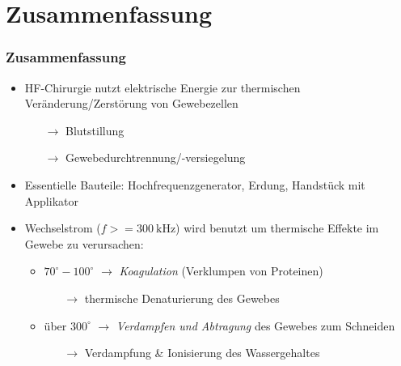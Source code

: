 \documentclass{beamer}
\begin{document}
\section{Zusammenfassung}
\begin{frame}
\frametitle{Zusammenfassung}
	\begin{itemize}
		\item HF-Chirurgie nutzt elektrische Energie zur thermischen Veränderung/Zerstörung von Gewebezellen
		\begin{itemize}
			\item [$\rightarrow$]Blutstillung
			\item [$\rightarrow$]Gewebedurchtrennung/-versiegelung
		\end{itemize}
		\item Essentielle Bauteile: Hochfrequenzgenerator, Erdung, Handstück mit Applikator
		\item Wechselstrom ($f>=\SI{300}{\kilo\hertz}$) wird benutzt um thermische Effekte im Gewebe zu verursachen:
		\begin{itemize}
			\item $70^\circ-100^\circ$ $\rightarrow$ \emph{Koagulation} (Verklumpen von Proteinen)
			\begin{itemize}
				\item [$\rightarrow$]thermische Denaturierung des Gewebes
			\end{itemize}
			\item über $300^\circ$ $\rightarrow$ \emph{Verdampfen und Abtragung} des Gewebes zum Schneiden
			\begin{itemize}
				\item [$\rightarrow$]Verdampfung \& Ionisierung des Wassergehaltes
			\end{itemize}
		\end{itemize}
	\end{itemize}
\end{frame}
\end{document}
